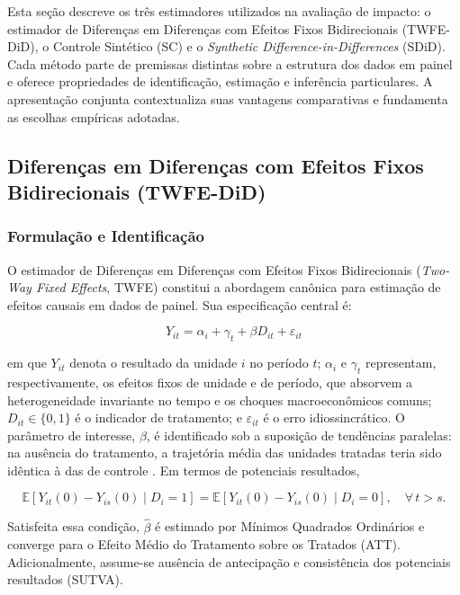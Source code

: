 \documentclass[a4paper,12pt]{article}
\begin{document}
Esta seção descreve os três estimadores utilizados na avaliação de impacto: o estimador
de Diferenças em Diferenças com Efeitos Fixos Bidirecionais (TWFE-DiD), o Controle
Sintético (SC) e o \textit{Synthetic Difference-in-Differences} (SDiD). Cada método parte
de premissas distintas sobre a estrutura dos dados em painel e oferece propriedades de
identificação, estimação e inferência particulares. A apresentação conjunta contextualiza
suas vantagens comparativas e fundamenta as escolhas empíricas adotadas.

\subsection{Diferenças em Diferenças com Efeitos Fixos Bidirecionais (TWFE-DiD)}

\subsubsection{Formulação e Identificação}

O estimador de Diferenças em Diferenças com Efeitos Fixos Bidirecionais
(\textit{Two-Way Fixed Effects}, TWFE) constitui a abordagem canônica para estimação de
efeitos causais em dados de painel. Sua especificação central é:

\begin{equation}
Y_{it} = \alpha_i + \gamma_t + \beta D_{it} + \varepsilon_{it}
\end{equation}

em que $Y_{it}$ denota o resultado da unidade $i$ no período $t$; $\alpha_i$ e $\gamma_t$
representam, respectivamente, os efeitos fixos de unidade e de período, que absorvem a
heterogeneidade invariante no tempo e os choques macroeconômicos comuns;
$D_{it} \in \{0,1\}$ é o indicador de tratamento; e $\varepsilon_{it}$ é o erro
idiossincrático. O parâmetro de interesse, $\beta$, é identificado sob a suposição de
tendências paralelas: na ausência do tratamento, a trajetória
média das unidades tratadas teria sido idêntica à das de controle \cite{angrist2009}. Em
termos de potenciais resultados,

\begin{equation}
\mathbb{E}[Y_{it}(0) - Y_{is}(0) \mid D_i = 1] =
\mathbb{E}[Y_{it}(0) - Y_{is}(0) \mid D_i = 0], \quad \forall\, t > s.
\end{equation}

Satisfeita essa condição, $\hat{\beta}$ é estimado por Mínimos Quadrados Ordinários e
converge para o Efeito Médio do Tratamento sobre os Tratados (ATT). Adicionalmente,
assume-se ausência de antecipação e consistência dos potenciais
resultados (SUTVA).
\end{document}
